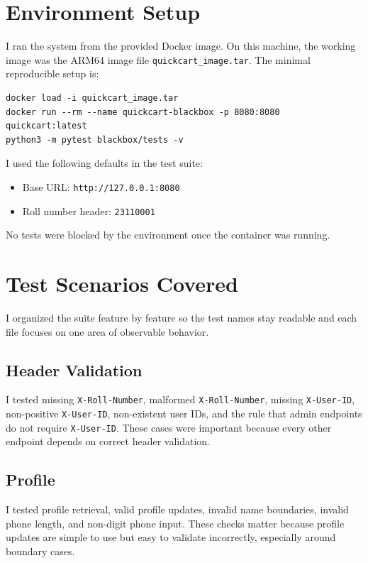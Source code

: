 \documentclass[12pt]{article}
\begin{document}
\section{Environment Setup}
I ran the system from the provided Docker image. On this machine, the working image was the ARM64 image file \texttt{quickcart\_image.tar}. The minimal reproducible setup is:

\begin{verbatim}
docker load -i quickcart_image.tar
docker run --rm --name quickcart-blackbox -p 8080:8080 quickcart:latest
python3 -m pytest blackbox/tests -v
\end{verbatim}

I used the following defaults in the test suite:

\begin{itemize}
  \item Base URL: \texttt{http://127.0.0.1:8080}
  \item Roll number header: \texttt{23110001}
\end{itemize}

No tests were blocked by the environment once the container was running.

\section{Test Scenarios Covered}
I organized the suite feature by feature so the test names stay readable and each file focuses on one area of observable behavior.

\subsection{Header Validation}
I tested missing \texttt{X-Roll-Number}, malformed \texttt{X-Roll-Number}, missing \texttt{X-User-ID}, non-positive \texttt{X-User-ID}, non-existent user IDs, and the rule that admin endpoints do not require \texttt{X-User-ID}. These cases were important because every other endpoint depends on correct header validation.

\subsection{Profile}
I tested profile retrieval, valid profile updates, invalid name boundaries, invalid phone length, and non-digit phone input. These checks matter because profile updates are simple to use but easy to validate incorrectly, especially around boundary cases.
\end{document}
